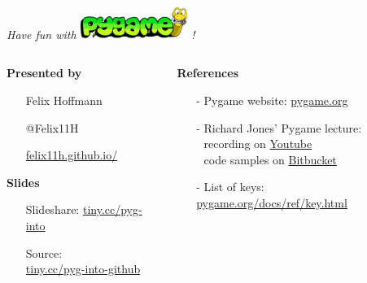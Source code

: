 \documentclass[handout]{beamer}   %
\begin{document}


\begin{frame}[fragile]
  \begin{center} 
    \huge \textit{Have fun
      with} \includegraphics[width=3.5cm]{img/pygame.png} \textit{!}
  \end{center}
  
  \vspace{0.45cm}

  \begin{columns}[t]
    \begin{column}{0.44\textwidth}        
      \textbf{Presented by}
      \normalsize
      \vspace{0.18cm}
      \begin{itemize}%
        \setlength{\itemindent}{-0.3cm}
        \item[] Felix Hoffmann
        \item[] @Felix11H
        \item[] \href{http://felix11h.github.io/}{felix11h.github.io/}
      \end{itemize}

      \vspace{0.38cm}
      \textbf{Slides}
      \normalsize
      \vspace{0.18cm}
      \begin{itemize}%
        \setlength{\itemindent}{-0.3cm}
        \item[] Slideshare: %
          \href{http://tiny.cc/pyg-into}{tiny.cc/pyg-into}
        \item[] Source: \\%
          \href{http://tiny.cc/pyg-into-github}{tiny.cc/pyg-into-github}
      \end{itemize}
    \end{column}
    \begin{column}{0.61\textwidth}
      \textbf{References}
      \vspace{0.28cm}
      \normalsize 
      \begin{itemize}%
        \itemsep9pt
        \item[-] Pygame website: \href{http://pygame.org}{pygame.org}
        \item[-] Richard Jones' Pygame lecture: \\
          \textcolor{white}{-} 
          recording on \href{%
            https://www.youtube.com/watch?v=mTmJfWdZzbo}{Youtube}\\
          \textcolor{white}{-} code samples on \href{%
            https://bitbucket.org/r1chardj0n3s/pygame-tutorial/src}{Bitbucket}
        \item[-] List of keys: \href{http://www.pygame.org/docs/ref/key.html}{pygame.org/docs/ref/key.html}


\end{itemize}
\end{column}
\end{columns}
\end{frame}
\end{document}
